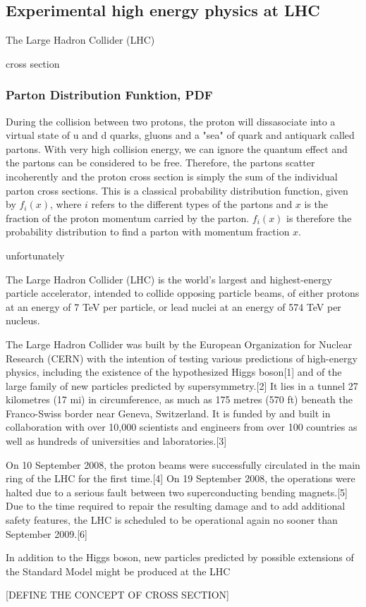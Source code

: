 \subsection{Experimental high energy physics at LHC}
The Large Hadron Collider (LHC) 


cross section




\subsubsection{Parton Distribution Funktion, PDF}
During the collision between two protons, the proton will dissasociate into a virtual state of u and d quarks, gluons and a "sea" of quark and antiquark called partons. With very high collision energy, we can ignore the quantum effect and the partons can be considered to be free. Therefore, the partons scatter incoherently and the proton cross section is simply the sum of the individual parton cross sections. This is a classical probability distribution function, given by $f_{i}(x)$, where $i$ refers to the different types of the partons and $x$ is the fraction of the proton momentum carried by the parton\cite{green2005hpp}. $f_{i}(x)$ is therefore the probability distribution to find a parton with momentum fraction $x$.


unfortunately





The Large Hadron Collider (LHC) is the world's largest and highest-energy particle accelerator, intended to collide opposing particle beams, of either protons at an energy of 7 TeV per particle, or lead nuclei at an energy of 574 TeV per nucleus.

The Large Hadron Collider was built by the European Organization for Nuclear Research (CERN) with the intention of testing various predictions of high-energy physics, including the existence of the hypothesized Higgs boson[1] and of the large family of new particles predicted by supersymmetry.[2] It lies in a tunnel 27 kilometres (17 mi) in circumference, as much as 175 metres (570 ft) beneath the Franco-Swiss border near Geneva, Switzerland. It is funded by and built in collaboration with over 10,000 scientists and engineers from over 100 countries as well as hundreds of universities and laboratories.[3]

On 10 September 2008, the proton beams were successfully circulated in the main ring of the LHC for the first time.[4] On 19 September 2008, the operations were halted due to a serious fault between two superconducting bending magnets.[5] Due to the time required to repair the resulting damage and to add additional safety features, the LHC is scheduled to be operational again no sooner than September 2009.[6]



In addition to the Higgs boson, new particles predicted by possible extensions of the Standard Model might be produced at the LHC

[DEFINE THE CONCEPT OF CROSS SECTION]

